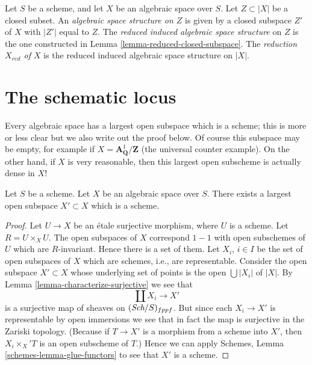 \begin{definition}
\label{definition-reduced-induced-space}
Let $S$ be a scheme, and let $X$ be an algebraic space over $S$.
Let $Z \subset |X|$ be a closed subset.
An {\it algebraic space structure on $Z$} is given by a closed subspace
$Z'$ of $X$ with $|Z'|$ equal to $Z$.
The {\it reduced induced algebraic space structure}
on $Z$ is the one constructed in
Lemma \ref{lemma-reduced-closed-subspace}.
The {\it reduction $X_{red}$ of $X$} is the reduced induced algebraic
space structure on $|X|$.
\end{definition}













\section{The schematic locus}
\label{section-schematic}

\noindent
Every algebraic space has a largest open subspace which is a
scheme; this is more or less clear but we also write out the proof below.
Of course this subspace may be empty, for example if
$X = \mathbf{A}^1_{\mathbf{Q}}/\mathbf{Z}$ (the universal
counter example). On the other hand, if $X$ is very reasonable, then
this largest open subscheme is actually dense in $X$!

\begin{lemma}
\label{lemma-subscheme}
Let $S$ be a scheme.
Let $X$ be an algebraic space over $S$.
There exists a largest open subspace $X' \subset X$ which is a scheme.
\end{lemma}

\begin{proof}
Let $U \to X$ be an \'etale surjective morphism, where $U$ is a scheme.
Let $R = U \times_X U$. The open subspaces of $X$ correspond $1 - 1$
with open subschemes of $U$ which are $R$-invariant. Hence there is a
set of them. Let $X_i$, $i \in I$ be the set of open subspaces
of $X$ which are schemes, i.e., are representable. Consider the
open subspace $X' \subset X$ whose underlying set of points is
the open $\bigcup |X_i|$ of $|X|$. By
Lemma \ref{lemma-characterize-surjective}
we see that
$$
\coprod X_i \longrightarrow X'
$$
is a surjective map of sheaves on $(\textit{Sch}/S)_{fppf}$.
But since each $X_i \to X'$ is representable by open immersions
we see that in fact the map is surjective in the Zariski
topology. (Because if $T \to X'$ is a morphism from a scheme
into $X'$, then $X_i \times_X' T$ is an open subscheme of $T$.)
Hence we can apply
Schemes, Lemma \ref{schemes-lemma-glue-functors}
to see that $X'$ is a scheme.
\end{proof}


